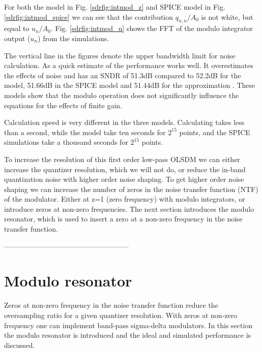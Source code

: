 For both the \simulink model in Fig.
\ref{sdrfig:intmod_z} and SPICE model in Fig. \ref{sdrfig:intmod_spice} we can
see that the contribution $q_{u,n}/A_0$ is not white, but 
equal to $u_n/A_0$.  Fig. \ref{sdrfig:intmod_u} shows the FFT
of the modulo integrator output ($u_n$) from the \simulink simulations.

The vertical line in the figures denote the
upper bandwidth limit for noise calculation. As a quick estimate of the performance
 works well. It overestimates the effects of noise and
has an SNDR of 51.3dB compared to 52.2dB for the \simulink model,
51.66dB in the SPICE model and 51.44dB for the approximation
.  These models show that the modulo operation does
not significantly influence the equations for the effects of finite gain.

Calculation speed is very different in the three models. Calculating  takes less than
a second, while the \simulink model take ten seconds for $2^{15}$
points, and the SPICE
simulations take a thousand seconds for $2^{15}$ points. 

To increase the resolution of this first order low-pass OLSDM we can either increase
the quantizer resolution, which we will not do, or reduce the in-band quantization
noise with higher order noise shaping. To get higher order
noise shaping we can increase the
number of zeros in the noise transfer function (NTF) of the
modulator. Either at z=1 (zero frequency) with modulo integrators, or  introduce
zeros at non-zero frequencies. The next section introduces the modulo
resonator, which is used to insert a zero at a non-zero frequency in
the noise transfer function.

\mymodintfig

 
-----------------------------------------------------



\section{Modulo resonator}\label{sdrmoduloresonator}

Zeros at non-zero frequency in the noise transfer function reduce the oversampling
ratio for a given quantizer resolution. With zeros at non-zero frequency one can 
implement band-pass sigma-delta modulators. In this section the modulo
resonator is introduced and the ideal and simulated performance
is discussed. 

